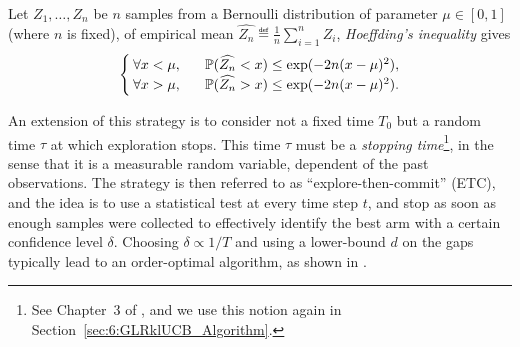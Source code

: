 %
\begin{lemma}\label{lem:2:HoeffdingInequality}
\begin{leftbar}[lemmabar]  %
    Let $Z_1,\dots,Z_n$ be $n$ \iid{} samples from a Bernoulli distribution of parameter $\mu\in[0,1]$ (where $n$ is fixed),
    of empirical mean $\widehat{Z_n} \eqdef \frac{1}{n} \sum_{i=1}^n Z_i$, \emph{Hoeffding's inequality} gives
    \vspace*{-5pt}  %
    \begin{align}\label{eq:2:HoeffdingInequality}
        \begin{cases}
            \forall x < \mu, \;\;\; & \mathbb{P}(\widehat{Z_n} < x) \leq \exp(-2 n (x-\mu)^2),
            \\
            \forall x > \mu, \;\;\; & \mathbb{P}(\widehat{Z_n} > x) \leq \exp(-2 n (x-\mu)^2).
        \end{cases}
    \end{align}
    \vspace*{-5pt}  %
\end{leftbar}  %
\end{lemma}

An extension of this strategy is to consider not a fixed time $T_0$ but a random time $\tau$ at which exploration stops.
This time $\tau$ must be a \emph{stopping time}\footnote{See Chapter~3 of \cite{LattimoreBanditAlgorithmsBook}, and we use this notion again in Section~\ref{sec:6:GLRklUCB_Algorithm}.},
in the sense that it is a measurable random variable, dependent of the past observations. The strategy is then referred to as ``explore-then-commit'' (ETC), and the idea is to use a statistical test at every time step $t$, and stop as soon as enough samples were collected to effectively identify the best arm with a certain confidence level $\delta$.
Choosing $\delta \propto 1/T$ and using a lower-bound $d$ on the gaps typically lead to an order-optimal algorithm, as shown in \cite{GarivierETC2016}.



